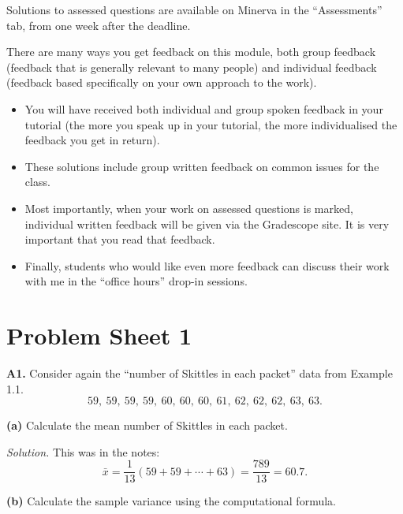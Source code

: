 \documentclass[
  a4paper,
]{book}
\providecommand{\tightlist}{%
  \setlength{\itemsep}{0pt}\setlength{\parskip}{0pt}}
\theoremstyle{definition}
\theoremstyle{definition}
\theoremstyle{definition}
\theoremstyle{definition}
\theoremstyle{remark}
\begin{document}
Solutions to assessed questions are available on Minerva in the ``Assessments'' tab, from one week after the deadline.

There are many ways you get feedback on this module, both group feedback (feedback that is generally relevant to many people) and individual feedback (feedback based specifically on your own approach to the work).

\begin{itemize}
\tightlist
\item
  You will have received both individual and group spoken feedback in your tutorial (the more you speak up in your tutorial, the more individualised the feedback you get in return).
\item
  These solutions include group written feedback on common issues for the class.
\item
  Most importantly, when your work on assessed questions is marked, individual written feedback will be given via the Gradescope site. It is very important that you read that feedback.
\item
  Finally, students who would like even more feedback can discuss their work with me in the ``office hours'' drop-in sessions.
\end{itemize}

\hypertarget{P1-solutions}{%
\section*{Problem Sheet 1}\label{P1-solutions}}

\textbf{A1.} Consider again the ``number of Skittles in each packet'' data from Example 1.1.
\[ 59, \ 59, \ 59, \ 59, \ 60, \ 60, \ 60, \ 61, \ 62, \ 62, \ 62, \ 63, \ 63 .\]

\textbf{(a)} Calculate the mean number of Skittles in each packet.

\begin{myanswers}
\emph{Solution.} This was in the notes:
\[ \bar x = \frac{1}{13} (59 + 59 + \cdots + 63) =  \frac{789}{13} = 60.7 .\]

\end{myanswers}

\textbf{(b)} Calculate the sample variance using the computational formula.
\end{document}
